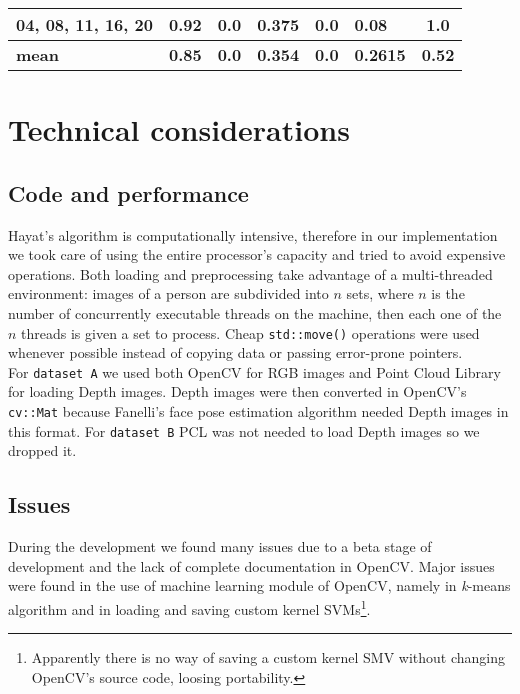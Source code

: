 \documentclass{article}
\begin{document}
\begin{table}[]
\begin{adjustwidth}{-.75in}{-.75in}
\begin{tabular}{|l|l|c|l|c|l|c|}
			04, 08, 11, 16, 20               & 0.92       & 0.0                       & 0.375      & 0.0                         & 0.08       & 1.0\\ \hline

			\bf mean                         & \bf 0.85   & \bf 0.0                   & \bf 0.354 & \bf 0.0                     & \bf 0.2615   & \bf 0.52\\ \hline
		\end{tabular}
	\end{adjustwidth}
\end{table}


\section{Technical considerations}

\subsection{Code and performance} \label{sec:code}
Hayat's algorithm is computationally intensive, therefore in our implementation we took care of using the entire processor's capacity and tried to avoid expensive operations. Both loading and preprocessing take advantage of a multi-threaded environment: images of a person are subdivided into $n$ sets, where $n$ is the number of concurrently executable threads on the machine, then each one of the $n$ threads is given a set to process. Cheap \verb|std::move()| operations were used whenever possible instead of copying data or passing error-prone pointers. \\
For \verb|dataset A| we used both OpenCV for RGB images and Point Cloud Library for loading Depth images. Depth images were then converted in OpenCV's \verb|cv::Mat| because Fanelli's face pose estimation algorithm needed Depth images in this format. For \verb|dataset B| PCL was not needed to load Depth images so we dropped it. \\

\subsection{Issues}
During the development we found many issues due to a beta stage of development  and the lack of complete documentation in OpenCV. Major issues were found in the use of machine learning module of OpenCV, namely in \textit{k}-means algorithm and in loading and saving custom kernel SVMs\footnote{Apparently there is no way of saving a custom kernel SMV without changing OpenCV's source code, loosing portability.}.
\end{document}
